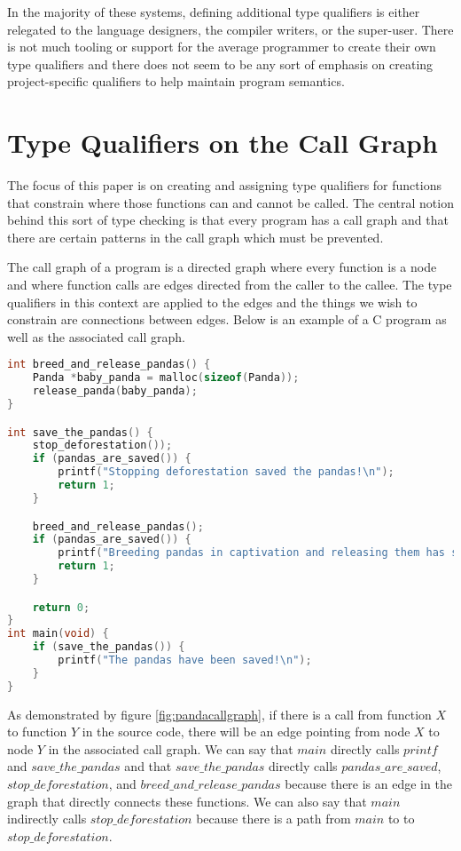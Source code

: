 In the majority of these systems, defining additional type qualifiers is either relegated to the language designers, the compiler writers, or the super-user.  There is not much tooling or support for the average programmer to create their own type qualifiers and there does not seem to be any sort of emphasis on creating project-specific qualifiers to help maintain program semantics.

\section{Type Qualifiers on the Call Graph}\label{sec:bac:callgraph}

The focus of this paper is on creating and assigning type qualifiers for functions that constrain where those functions can and cannot be called.  The central notion behind this sort of type checking is that every program has a call graph and that there are certain patterns in the call graph which must be prevented.  

The call graph of a program is a directed graph where every function is a node and where function calls are edges directed from the caller to the callee.  The type qualifiers in this context are applied to the edges and the things we wish to constrain are connections between edges.  Below is an example of a C program as well as the associated call graph.

\begin{minipage}[c]{0.95\textwidth}
\begin{lstlisting}[language=C]
int breed_and_release_pandas() {
    Panda *baby_panda = malloc(sizeof(Panda));
    release_panda(baby_panda);
}

int save_the_pandas() {
	stop_deforestation());
	if (pandas_are_saved()) {
		printf("Stopping deforestation saved the pandas!\n");
		return 1;
	}

	breed_and_release_pandas();
	if (pandas_are_saved()) {
		printf("Breeding pandas in captivation and releasing them has saved the pandas!\n");
		return 1;
	}

	return 0;
}
int main(void) {
	if (save_the_pandas()) {
		printf("The pandas have been saved!\n");
	}
}
\end{lstlisting}
\end{minipage}



As demonstrated by figure \ref{fig:pandacallgraph}, if there is a call from function $X$ to function $Y$ in the source code, there will be an edge pointing from node $X$ to node $Y$ in the associated call graph.  We can say that $main$ directly calls $printf$ and $save\_the\_pandas$ and that $save\_the\_pandas$ directly calls $pandas\_are\_saved$, $stop\_deforestation$, and $breed\_and\_release\_pandas$ because there is an edge in the graph that directly connects these functions.  We can also say that $main$ indirectly calls $stop\_deforestation$ because there is a path from $main$ to to $stop\_deforestation$.

